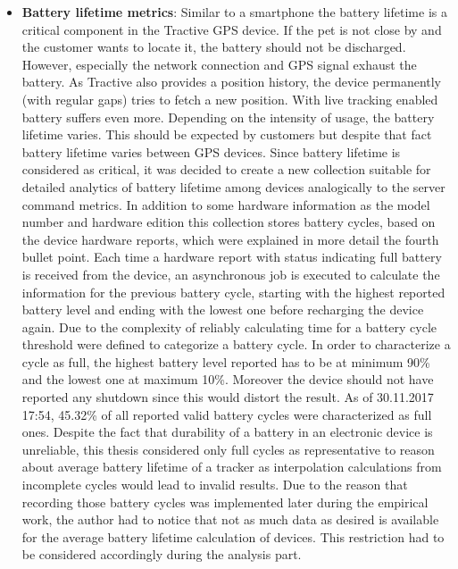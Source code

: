 \begin{itemize}
	\item \textbf{Battery lifetime metrics}: Similar to a smartphone the battery lifetime is a critical component in the Tractive GPS device. If the pet is not close by and the customer wants to locate it, the battery should not be discharged. However, especially the network connection and GPS signal exhaust the battery. As Tractive also provides a position history, the device permanently (with regular gaps) tries to fetch a new position. With live tracking enabled battery suffers even more. Depending on the intensity of usage, the battery lifetime varies. This should be expected by customers but despite that fact battery lifetime varies between GPS devices. Since battery lifetime is considered as critical, it was decided to create a new collection suitable for detailed analytics of battery lifetime among devices analogically to the server command metrics. In addition to some hardware information as the model number and hardware edition this collection stores battery cycles, based on the device hardware reports, which were explained in more detail the fourth bullet point. Each time a hardware report with status indicating full battery is received from the device, an asynchronous job is executed to calculate the information for the previous battery cycle, starting with the highest reported battery level and ending with the lowest one before recharging the device again. Due to the complexity of reliably calculating time for a battery cycle threshold were defined to categorize a battery cycle. In order to characterize a cycle as full, the highest battery level reported has to be at minimum 90\% and the lowest one at maximum 10\%. Moreover the device should not have reported any shutdown since this would distort the result. As of 30.11.2017 17:54, 45.32\% of all reported valid battery cycles were characterized as full ones. Despite the fact that durability of a battery in an electronic device is unreliable, this thesis considered only full cycles as representative to reason about average battery lifetime of a tracker as interpolation calculations from incomplete cycles would lead to invalid results. Due to the reason that recording those battery cycles was implemented later during the empirical work, the author had to notice that not as much data as desired is available for the average battery lifetime calculation of devices. This restriction had to be considered accordingly during the analysis part. 
\end{itemize}


